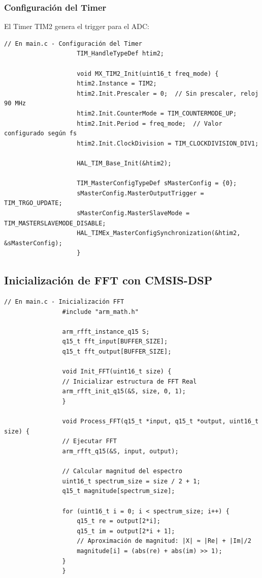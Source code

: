 \documentclass[12pt]{article}
\begin{document}
			\subsubsection{Configuración del Timer}

				El Timer TIM2 genera el trigger para el ADC:

				\begin{lstlisting}[style=mystyle, caption=Configuración del Timer]
					// En main.c - Configuración del Timer
					TIM_HandleTypeDef htim2;

					void MX_TIM2_Init(uint16_t freq_mode) {
					htim2.Instance = TIM2;
					htim2.Init.Prescaler = 0;  // Sin prescaler, reloj 90 MHz
					htim2.Init.CounterMode = TIM_COUNTERMODE_UP;
					htim2.Init.Period = freq_mode;  // Valor configurado según fs
					htim2.Init.ClockDivision = TIM_CLOCKDIVISION_DIV1;
					
					HAL_TIM_Base_Init(&htim2);
					
					TIM_MasterConfigTypeDef sMasterConfig = {0};
					sMasterConfig.MasterOutputTrigger = TIM_TRGO_UPDATE;
					sMasterConfig.MasterSlaveMode = TIM_MASTERSLAVEMODE_DISABLE;
					HAL_TIMEx_MasterConfigSynchronization(&htim2, &sMasterConfig);
					}
				\end{lstlisting}

		\subsection{Inicialización de FFT con CMSIS-DSP}

			\begin{lstlisting}[style=mystyle, caption=Inicialización de FFT]
				// En main.c - Inicialización FFT
				#include "arm_math.h"

				arm_rfft_instance_q15 S;
				q15_t fft_input[BUFFER_SIZE];
				q15_t fft_output[BUFFER_SIZE];

				void Init_FFT(uint16_t size) {
				// Inicializar estructura de FFT Real
				arm_rfft_init_q15(&S, size, 0, 1);
				}

				void Process_FFT(q15_t *input, q15_t *output, uint16_t size) {
				// Ejecutar FFT
				arm_rfft_q15(&S, input, output);
				
				// Calcular magnitud del espectro
				uint16_t spectrum_size = size / 2 + 1;
				q15_t magnitude[spectrum_size];
				
				for (uint16_t i = 0; i < spectrum_size; i++) {
					q15_t re = output[2*i];
					q15_t im = output[2*i + 1];
					// Aproximación de magnitud: |X| ≈ |Re| + |Im|/2
					magnitude[i] = (abs(re) + abs(im) >> 1);
				}
				}
			\end{lstlisting}
\end{document}

